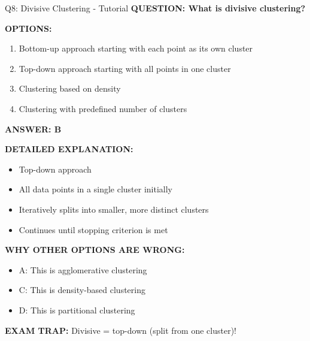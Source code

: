 \documentclass[8pt]{beamer}
\begin{document}
	\begin{frame}{Q8: Divisive Clustering - Tutorial}
		\fontsize{6.5}{7.5}\selectfont
		\textbf{QUESTION: What is divisive clustering?}
		
		\vspace{0.1cm}
		\textbf{OPTIONS:}
		\begin{enumerate}
			\item Bottom-up approach starting with each point as its own cluster
			\item Top-down approach starting with all points in one cluster
			\item Clustering based on density
			\item Clustering with predefined number of clusters
		\end{enumerate}
		
		\vspace{0.1cm}
		\textcolor{myblue}{\textbf{ANSWER: B}}
		
		\vspace{0.1cm}
		\textbf{DETAILED EXPLANATION:}
		\begin{itemize}
			\item Top-down approach
			\item All data points in a single cluster initially
			\item Iteratively splits into smaller, more distinct clusters
			\item Continues until stopping criterion is met
		\end{itemize}
		
		\vspace{0.1cm}
		\textcolor{myred}{\textbf{WHY OTHER OPTIONS ARE WRONG:}}
		\begin{itemize}
			\item \textcolor{myred}{A:} This is agglomerative clustering
			\item \textcolor{myred}{C:} This is density-based clustering
			\item \textcolor{myred}{D:} This is partitional clustering
		\end{itemize}
		
		\textcolor{myred}{\textbf{EXAM TRAP:}} Divisive = \textcolor{myblue}{top-down} (split from one cluster)!
	\end{frame}
	
\end{document}
